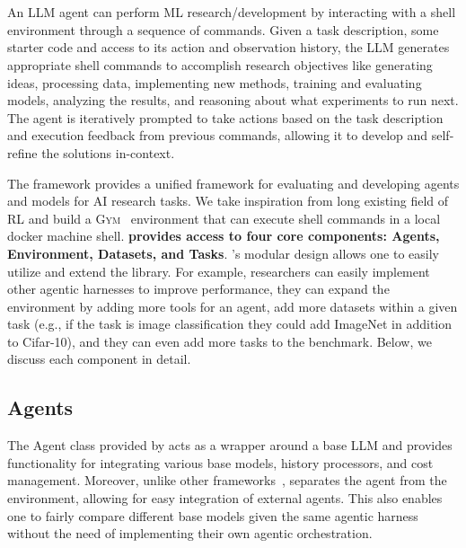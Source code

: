 \section{\mlgym}

An LLM agent can perform ML research/development by interacting with a shell environment through a sequence of commands.
%
Given a task description, some starter code and access to its action and observation history, the LLM generates appropriate shell commands to accomplish research objectives like generating ideas, processing data, implementing new methods, training and evaluating models, analyzing the results, and reasoning about what experiments to run next.
%
The agent is iteratively prompted to take actions based on the task description and execution feedback from previous commands, allowing it to develop and self-refine the solutions in-context.
%

The \mlgym framework provides a unified framework for evaluating and developing agents and models for AI research tasks. We take inspiration from long existing field of RL and build a \textsc{Gym}~\citep{brockman2016openaigym} environment that can execute shell commands in a local docker machine shell. 
\mlgym \textbf{provides access to four core components: Agents, Environment, Datasets, and Tasks}. \mlgym's modular design allows one to easily utilize and extend the library.
For example, researchers can easily implement other agentic harnesses to improve performance, they can expand the environment by adding more tools for an agent, add more datasets within a given task (e.g., if the task is image classification they could add ImageNet in addition to Cifar-10), and they can even add more tasks to the \mlgym benchmark. Below, we discuss each component in detail.

\subsection{Agents}
\label{sec:agents}
The Agent class provided by \mlgym acts as a wrapper around a base LLM and provides functionality for integrating various base models, history processors, and cost management.
%
Moreover, unlike other frameworks~\citep{huangMLAgentBenchEvaluatingLanguage2024,yangSWEagentAgentComputerInterfaces2024}, \mlgym separates the agent from the environment, allowing for easy integration of external agents.
This also enables one to fairly compare different base models given the same agentic harness without the need of implementing their own agentic orchestration.

